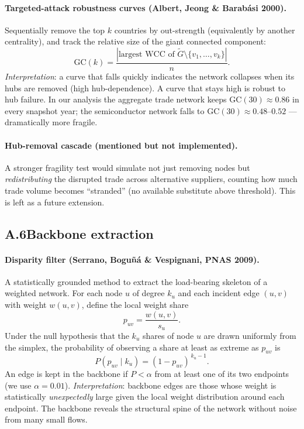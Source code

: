 \documentclass[11pt,a4paper]{article}
\begin{document}
\paragraph{Targeted-attack robustness curves
(Albert, Jeong \& Barab\'asi 2000).}
Sequentially remove the top $k$ countries by out-strength
(equivalently by another centrality), and track the relative size of the
giant connected component:
\[
\mathrm{GC}(k) = \frac{|\text{largest WCC of }\tilde{G}\setminus \{v_1, \dots, v_k\}|}{n}.
\]
\emph{Interpretation}: a curve that falls quickly indicates the network
collapses when its hubs are removed (high hub-dependence).
A curve that stays high is robust to hub failure.
In our analysis the aggregate trade network keeps $\mathrm{GC}(30) \approx 0.86$
in every snapshot year; the semiconductor network falls to
$\mathrm{GC}(30) \approx 0.48$--$0.52$ — dramatically more fragile.

\paragraph{Hub-removal cascade (mentioned but not implemented).}
A stronger fragility test would simulate not just removing nodes but
\emph{redistributing} the disrupted trade across alternative suppliers,
counting how much trade volume becomes ``stranded'' (no available
substitute above threshold). This is left as a future extension.

\subsection*{A.6\quad Backbone extraction}

\paragraph{Disparity filter (Serrano, Bogu\~n\'a \& Vespignani, PNAS 2009).}
A statistically grounded method to extract the load-bearing skeleton of
a weighted network. For each node $u$ of degree $k_u$ and each incident
edge $(u,v)$ with weight $w(u,v)$, define the local weight share
\[
p_{uv} = \frac{w(u,v)}{s_u}.
\]
Under the null hypothesis that the $k_u$ shares of node $u$ are drawn
uniformly from the simplex, the probability of observing a share at
least as extreme as $p_{uv}$ is
\[
P(p_{uv} \mid k_u) = (1 - p_{uv})^{\,k_u - 1}.
\]
An edge is kept in the backbone if $P < \alpha$ from at least one of its
two endpoints (we use $\alpha = 0.01$).
\emph{Interpretation}: backbone edges are those whose weight is
statistically \emph{unexpectedly} large given the local weight
distribution around each endpoint. The backbone reveals the structural
spine of the network without noise from many small flows.
\end{document}
